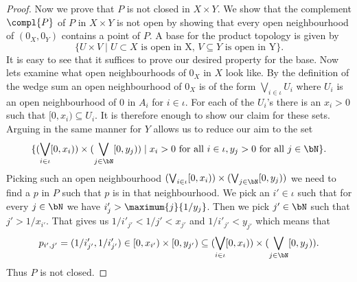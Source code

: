 \begin{proof}
    Now we prove that $P$ is not closed in $X \times Y$. 
    We show that the complement $\compl{P}$ of $P$ in $X \times Y$ is not open by showing that every open neighbourhood of $(0_X, 0_Y)$ contains a point of $P$. 
    A base for the product topology is given by 
    \[\{ U \times V \mid U \subset X \text{ is open in X, } V \subseteq Y \text{ is open in Y}\}. \]
    It is easy to see that it suffices to prove our desired property for the base.
    Now lets examine what open neighbourhoods of $0_X$ in $X$ look like. 
    By the definition of the wedge sum an open neighbourhood of $0_X$ is of the form $\bigvee_{i \in \iota}U_i$ where $U_i$ is an open neighbourhood of $0$ in $A_i$ for $i \in \iota$. 
    For each of the $U_i$'s there is an $x_i > 0$ such that $[0, x_i) \subseteq U_i$. 
    It is therefore enough to show our claim for these sets. 
    Arguing in the same manner for $Y$ allows us to reduce our aim to the set 
    \[\{(\bigvee_{i \in \iota}[0, x_i)) \times (\bigvee_{j \in \bN}[0, y_j)) \mid x_i > 0 \text{ for all } i \in \iota, y_j > 0 \text{ for all } j \in \bN\}.\] 
    Picking such an open neighbourhood $(\bigvee_{i \in \iota}[0, x_i)) \times (\bigvee_{j \in \bN}[0, y_j))$ we need to find a $p$ in $P$ such that $p$ is in that neighbourhood.
    We pick an $i' \in \iota$ such that for every $j \in \bN$ we have $i'_j > \maximum{j}{1/y_j}$. 
    Then we pick $j' \in \bN$ such that $j' > 1/x_{i'}$. 
    That gives us $1/i'_{j'} < 1/j' < x_{j'}$ and $1/i'_{j'} < y_{j'}$ which means that 
    \[p_{i', j'} = (1/i'_{j'}, 1/i'_{j'}) \in [0, x_{i'}) \times [0, y_{j'}) \subseteq (\bigvee_{i \in \iota}[0, x_i)) \times (\bigvee_{j \in \bN}[0, y_j)).\]
    Thus $P$ is not closed. 
\end{proof}